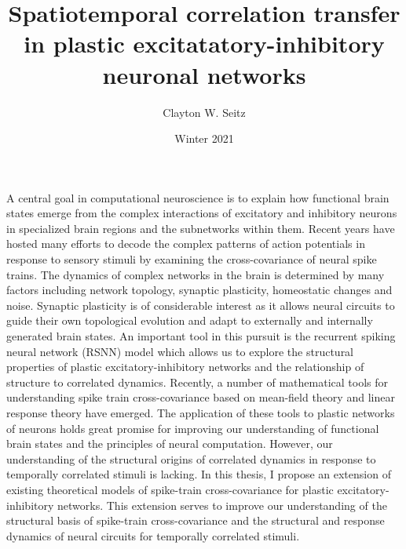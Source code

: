 \documentclass{ucetd}
\title{Spatiotemporal correlation transfer in plastic excitatatory-inhibitory neuronal networks}
\author{Clayton W. Seitz}
\date{Winter 2021}
\begin{document}
\maketitle

\makecopyright
\makeepigraph


\tableofcontents

\acknowledgments

\abstract

A central goal in computational neuroscience is to explain how functional brain states emerge from the complex interactions of excitatory and inhibitory neurons in specialized brain regions and the subnetworks within them. Recent years have hosted many efforts to decode the complex patterns of action potentials in response to sensory stimuli by examining the cross-covariance of neural spike trains. The dynamics of complex networks in the brain is determined by many factors including network topology, synaptic plasticity, homeostatic changes and noise. Synaptic plasticity is of considerable interest as it allows neural circuits to guide their own topological evolution and adapt to externally and internally generated brain states. An important tool in this pursuit is the recurrent spiking neural network (RSNN) model which allows us to explore the structural properties of plastic excitatory-inhibitory networks and the relationship of structure to correlated dynamics. Recently, a number of mathematical tools for understanding spike train cross-covariance based on mean-field theory and linear response theory have emerged. The application of these tools to plastic networks of neurons holds great promise for improving our understanding of functional brain states and the principles of neural computation. However, our understanding of the structural origins of correlated dynamics in response to temporally correlated stimuli is lacking. In this thesis, I propose an extension of existing theoretical models of spike-train cross-covariance for plastic excitatory-inhibitory networks. This extension serves to improve our understanding of the structural basis of spike-train cross-covariance and the structural and response dynamics of neural circuits for temporally correlated stimuli.
\clearpage
\end{document}
